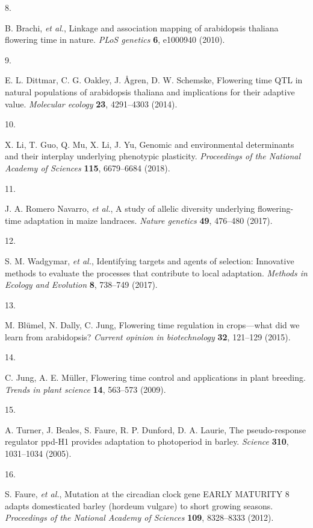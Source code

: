 \documentclass[
  9pt,
  twocolumn,
  twoside]{pnas-new}
\newlength{\cslhangindent}
\newlength{\csllabelwidth}
\newenvironment{CSLReferences}[2] %
 {\begin{list}{}{%
  \setlength{\itemindent}{0pt}
  \setlength{\leftmargin}{0pt}
  \setlength{\parsep}{0pt}
  \ifodd #1
   \setlength{\leftmargin}{\cslhangindent}
   \setlength{\itemindent}{-1\cslhangindent}
  \fi
  \setlength{\itemsep}{#2\baselineskip}}}
 {\end{list}}
\newcommand{\CSLLeftMargin}[1]{\parbox[t]{\csllabelwidth}{\strut#1\strut}}
\newcommand{\CSLRightInline}[1]{\parbox[t]{\linewidth - \csllabelwidth}{\strut#1\strut}}
\begin{document}
\begin{CSLReferences}{0}{1}
\CSLLeftMargin{8. }%
\CSLRightInline{B. Brachi, \emph{et al.}, Linkage and association
mapping of arabidopsis thaliana flowering time in nature. \emph{PLoS
genetics} \textbf{6}, e1000940 (2010).}

\CSLLeftMargin{9. }%
\CSLRightInline{E. L. Dittmar, C. G. Oakley, J. Ågren, D. W. Schemske,
Flowering time QTL in natural populations of arabidopsis thaliana and
implications for their adaptive value. \emph{Molecular ecology}
\textbf{23}, 4291--4303 (2014).}

\CSLLeftMargin{10. }%
\CSLRightInline{X. Li, T. Guo, Q. Mu, X. Li, J. Yu, Genomic and
environmental determinants and their interplay underlying phenotypic
plasticity. \emph{Proceedings of the National Academy of Sciences}
\textbf{115}, 6679--6684 (2018).}

\CSLLeftMargin{11. }%
\CSLRightInline{J. A. Romero Navarro, \emph{et al.}, A study of allelic
diversity underlying flowering-time adaptation in maize landraces.
\emph{Nature genetics} \textbf{49}, 476--480 (2017).}

\CSLLeftMargin{12. }%
\CSLRightInline{S. M. Wadgymar, \emph{et al.}, Identifying targets and
agents of selection: Innovative methods to evaluate the processes that
contribute to local adaptation. \emph{Methods in Ecology and Evolution}
\textbf{8}, 738--749 (2017).}

\CSLLeftMargin{13. }%
\CSLRightInline{M. Blümel, N. Dally, C. Jung, Flowering time regulation
in crops---what did we learn from arabidopsis? \emph{Current opinion in
biotechnology} \textbf{32}, 121--129 (2015).}

\CSLLeftMargin{14. }%
\CSLRightInline{C. Jung, A. E. Müller, Flowering time control and
applications in plant breeding. \emph{Trends in plant science}
\textbf{14}, 563--573 (2009).}

\CSLLeftMargin{15. }%
\CSLRightInline{A. Turner, J. Beales, S. Faure, R. P. Dunford, D. A.
Laurie, The pseudo-response regulator ppd-H1 provides adaptation to
photoperiod in barley. \emph{Science} \textbf{310}, 1031--1034 (2005).}

\CSLLeftMargin{16. }%
\CSLRightInline{S. Faure, \emph{et al.}, Mutation at the circadian clock
gene EARLY MATURITY 8 adapts domesticated barley (hordeum vulgare) to
short growing seasons. \emph{Proceedings of the National Academy of
Sciences} \textbf{109}, 8328--8333 (2012).}


\end{CSLReferences}
\end{document}
